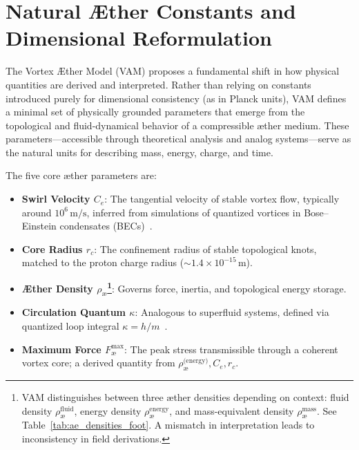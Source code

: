 \section{Natural Æther Constants and Dimensional Reformulation}

The Vortex Æther Model (VAM) proposes a fundamental shift in how physical quantities are derived and interpreted. Rather than relying on constants introduced purely for dimensional consistency (as in Planck units), VAM defines a minimal set of physically grounded parameters that emerge from the topological and fluid-dynamical behavior of a compressible æther medium. These parameters—accessible through theoretical analysis and analog systems—serve as the natural units for describing mass, energy, charge, and time.

The five core æther parameters are:

\begin{itemize}
    \item \textbf{Swirl Velocity \( C_e \)}: The tangential velocity of stable vortex flow, typically around \( 10^6 \, \text{m/s} \), inferred from simulations of quantized vortices in Bose–Einstein condensates (BECs)~\cite{Pethick2008BEC,Kleckner2013KnottedVortices}.

    \item \textbf{Core Radius \( r_c \)}: The confinement radius of stable topological knots, matched to the proton charge radius (\( \sim 1.4 \times 10^{-15} \, \text{m} \)).

    \item \textbf{Æther Density \( \rho_\text{\ae} \)\footnote{VAM distinguishes between three æther densities depending on context: fluid density \( \rho_\text{\ae}^{\text{fluid}} \), energy density \( \rho_\text{\ae}^{\text{energy}} \), and mass-equivalent density \( \rho_\text{\ae}^{\text{mass}} \). See Table~\ref{tab:ae_densities_foot}. A mismatch in interpretation leads to inconsistency in field derivations.}}: Governs force, inertia, and topological energy storage.

    \item \textbf{Circulation Quantum \( \kappa \)}: Analogous to superfluid systems, defined via quantized loop integral \( \kappa = h / m \)~\cite{Donnelly1991QuantizedVortices}.

    \item \textbf{Maximum Force \( F^{\text{max}}_{\text{\ae}} \)}: The peak stress transmissible through a coherent vortex core; a derived quantity from \( \rho_\text{\ae}^{\text{(energy)}}, C_e, r_c \).
\end{itemize}

